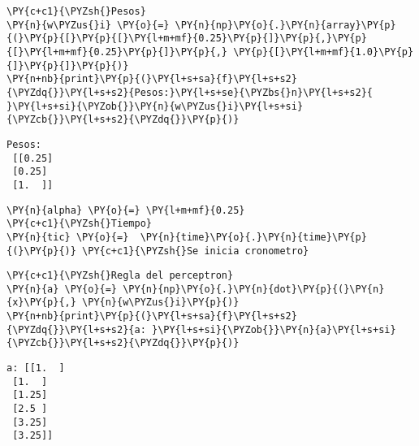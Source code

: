     \begin{tcolorbox}[breakable, size=fbox, boxrule=1pt, pad at break*=1mm,colback=cellbackground, colframe=cellborder]
\begin{Verbatim}[commandchars=\\\{\}]
\PY{c+c1}{\PYZsh{}Pesos}
\PY{n}{w\PYZus{}i} \PY{o}{=} \PY{n}{np}\PY{o}{.}\PY{n}{array}\PY{p}{(}\PY{p}{[}\PY{p}{[}\PY{l+m+mf}{0.25}\PY{p}{]}\PY{p}{,}\PY{p}{[}\PY{l+m+mf}{0.25}\PY{p}{]}\PY{p}{,} \PY{p}{[}\PY{l+m+mf}{1.0}\PY{p}{]}\PY{p}{]}\PY{p}{)}
\PY{n+nb}{print}\PY{p}{(}\PY{l+s+sa}{f}\PY{l+s+s2}{\PYZdq{}}\PY{l+s+s2}{Pesos:}\PY{l+s+se}{\PYZbs{}n}\PY{l+s+s2}{ }\PY{l+s+si}{\PYZob{}}\PY{n}{w\PYZus{}i}\PY{l+s+si}{\PYZcb{}}\PY{l+s+s2}{\PYZdq{}}\PY{p}{)}
\end{Verbatim}
\end{tcolorbox}

    \begin{Verbatim}[commandchars=\\\{\}]
Pesos:
 [[0.25]
 [0.25]
 [1.  ]]
    \end{Verbatim}

    \begin{tcolorbox}[breakable, size=fbox, boxrule=1pt, pad at break*=1mm,colback=cellbackground, colframe=cellborder]
\begin{Verbatim}[commandchars=\\\{\}]
\PY{n}{alpha} \PY{o}{=} \PY{l+m+mf}{0.25}
\PY{c+c1}{\PYZsh{}Tiempo}
\PY{n}{tic} \PY{o}{=}  \PY{n}{time}\PY{o}{.}\PY{n}{time}\PY{p}{(}\PY{p}{)} \PY{c+c1}{\PYZsh{}Se inicia cronometro}
\end{Verbatim}
\end{tcolorbox}

    \begin{tcolorbox}[breakable, size=fbox, boxrule=1pt, pad at break*=1mm,colback=cellbackground, colframe=cellborder]
\begin{Verbatim}[commandchars=\\\{\}]
\PY{c+c1}{\PYZsh{}Regla del perceptron}
\PY{n}{a} \PY{o}{=} \PY{n}{np}\PY{o}{.}\PY{n}{dot}\PY{p}{(}\PY{n}{x}\PY{p}{,} \PY{n}{w\PYZus{}i}\PY{p}{)}
\PY{n+nb}{print}\PY{p}{(}\PY{l+s+sa}{f}\PY{l+s+s2}{\PYZdq{}}\PY{l+s+s2}{a: }\PY{l+s+si}{\PYZob{}}\PY{n}{a}\PY{l+s+si}{\PYZcb{}}\PY{l+s+s2}{\PYZdq{}}\PY{p}{)}
\end{Verbatim}
\end{tcolorbox}

    \begin{Verbatim}[commandchars=\\\{\}]
a: [[1.  ]
 [1.  ]
 [1.25]
 [2.5 ]
 [3.25]
 [3.25]]
    \end{Verbatim}

